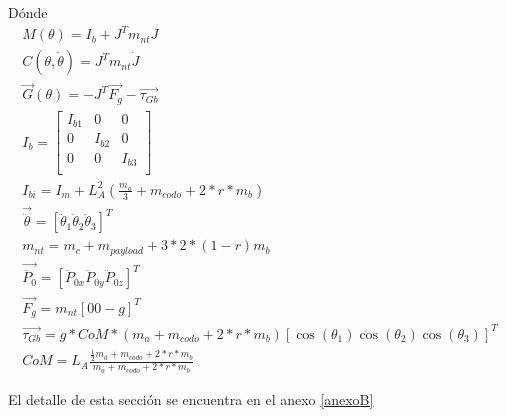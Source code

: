         
        Dónde
        \begin{gather}
                 M \left(  \theta  \right) =I_{b}+J^{T} m_{nt} J 
                \label{eq:cap4_MB_26}\\
                 C \left(  \theta ,\dot{ \theta } \right) =J^{T} m_{nt}\dot{J} 
                 \label{eq:cap4_MB_27}\\
                 \overrightarrow{G} \left(  \theta  \right) =- J^{T}\overrightarrow{F_{g}}-\overrightarrow{ \tau_{Gb}}
                 \label{eq:cap4_MB_28}\\
                I_{b}= \left[ \begin{matrix}
                    I_{b1}  &  0  &  0\\
                    0  &  I_{b2}  &  0\\
                    0  &  0  &  I_{b3}\\
                \end{matrix}\right]  
                \label{eq:cap4_MB_29}\\
                I_{bi}=I_{m}+ L_{A}^{2} \left( \frac{m_{a}}{3}+m_{codo}+2\ast r \ast m_{b} \right) \\
                \overrightarrow{\ddot{ \theta }}= \left[ \ddot{ \theta }_{1} \ddot{ \theta }_{2} \ddot{ \theta }_{3}\right] ^{T} 
                \label{eq:cap4_MB_30}\\
                m_{nt}=m_{c}+m_{payload}+3\ast 2 \ast \left( 1-r \right) m_{b} 
                \label{eq:cap4_MB_31}\\
                \overrightarrow{\ddot{P_{0}}}= \left[ \ddot{P}_{0x} \ddot{P}_{0y} \ddot{P}_{0z} \right] ^{T} 
                \label{eq:cap4_MB_32}\\
                \overrightarrow{F_{g}}=m_{nt}  \left[ 0  0  -g \right] ^{T} 
                \label{eq:cap4_MB_33}\\
                \overrightarrow{ \tau_{Gb}}=g \ast CoM\ast \left( m_{a}+m_{codo}+2 \ast r \ast m_{b} \right)  \left[ \cos\left(\theta _{1} \right) \cos  \left(  \theta _{2} \right)  \cos  \left(  \theta _{3} \right)  \right] ^{T} 
                \label{eq:cap4_MB_34}\\
                CoM=L_{A} \frac{\frac{1}{2} m_{a}+m_{codo}+2 \ast r \ast m_{b}}{m_{a}+m_{codo}+2 \ast r \ast m_{b}}
                \label{eq:cap4_MB_35}
        \end{gather}
        
        El detalle de esta sección se encuentra en el anexo \ref{anexoB}



